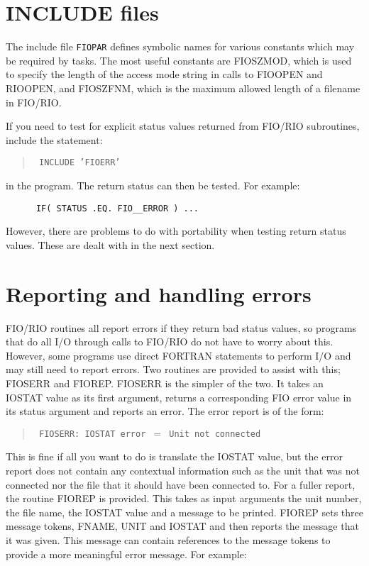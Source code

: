 \documentclass[twoside,11pt]{article}
\renewcommand{\_}{\texttt{\symbol{95}}}
\begin{document}
\section{INCLUDE files}
\label{include-files}

The include file {\tt FIO\_PAR} defines symbolic names for various constants
which  may be required by tasks. The most useful constants are FIO\_\_SZMOD,
which is used to specify the length of the access mode string in calls to
FIO\_OPEN and RIO\_OPEN, and FIO\_\_SZFNM, which is the maximum allowed length
of a filename in FIO/RIO.

If you need to test for explicit status values returned from FIO/RIO
subroutines, include the statement:

\begin{quote}{\tt
      INCLUDE 'FIO\_ERR'
}
\end{quote}

in the program. The return status can then be tested. For example:

\begin{verbatim}
      IF( STATUS .EQ. FIO__ERROR ) ...
\end{verbatim}

However, there are problems to do with portability when testing return status
values. These are dealt with in the next section.

\section{Reporting and handling errors}
\label{errors}

FIO/RIO routines all report errors if they return bad status values, so
programs that do all I/O through calls to FIO/RIO do not have to worry about
this. However, some programs use direct FORTRAN statements to perform I/O and
may still need to report errors. Two routines are provided to assist with this;
FIO\_SERR and FIO\_REP. FIO\_SERR is the simpler of the two. It takes an IOSTAT
value as its first argument, returns a corresponding FIO error value in its
status argument and reports an error. The error report is of the form:

\begin{quote}{\tt
FIO\_SERR: IOSTAT error $=$ Unit not connected
}
\end{quote}

This is fine if all you want to do is translate the IOSTAT value, but the error
report does not contain any contextual information such as the unit that was
not connected nor the file that it should have been connected to. For a fuller
report, the routine FIO\_REP is provided. This takes as input arguments the
unit number, the file name, the IOSTAT value and a message to be printed.
FIO\_REP sets three message tokens, FNAME, UNIT and IOSTAT and then reports the
message that it was given. This message can contain references to the message
tokens to provide a more meaningful error message. For example:
\end{document}
